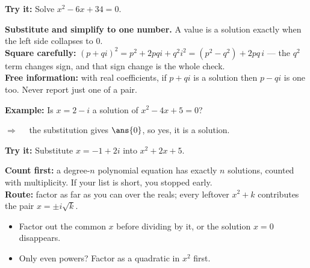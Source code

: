 \documentclass[12pt]{article}
\begin{document}
\begin{tryitbox}
\textbf{Try it:} Solve $x^2 - 6x + 34 = 0$.\\[2pt]
\end{tryitbox}


\begin{formulabox}
\textbf{Substitute and simplify to one number.} A value is a solution exactly
when the left side collapses to $0$.\\[3pt]
\textbf{Square carefully:} $(p + qi)^2 = p^2 + 2pqi + q^2i^2 = (p^2 - q^2) +
2pq\,i$ --- the $q^2$ term changes sign, and that sign change is the whole
check.\\[3pt]
\textbf{Free information:} with real coefficients, if $p + qi$ is a solution
then $p - qi$ is one too. Never report just one of a pair.
\end{formulabox}

\begin{examplebox}
\textbf{Example:} Is $x = 2 - i$ a solution of $x^2 - 4x + 5 = 0$?

$\Rightarrow\quad$ the substitution gives $\ans{0}$, so yes, it is a solution.
\end{examplebox}

\begin{tryitbox}
\textbf{Try it:} Substitute $x = -1 + 2i$ into $x^2 + 2x + 5$.\\[2pt]
\end{tryitbox}


\begin{formulabox}
\textbf{Count first:} a degree-$n$ polynomial equation has exactly $n$
solutions, counted with multiplicity. If your list is short, you stopped
early.\\[3pt]
\textbf{Route:} factor as far as you can over the reals; every leftover
$x^2 + k$ contributes the pair $x = \pm i\sqrt{k}$.
\begin{itemize}[leftmargin=1.1cm, itemsep=1pt, topsep=2pt]
\item Factor out the common $x$ before dividing by it, or the solution
$x = 0$ disappears.
\item Only even powers? Factor as a quadratic in $x^2$ first.
\end{itemize}
\end{formulabox}
\end{document}
